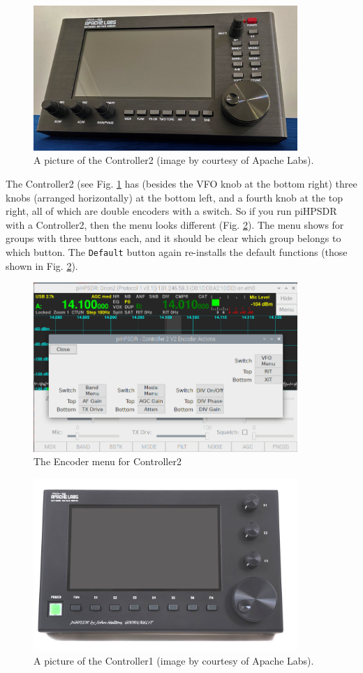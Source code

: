 \documentclass[12pt]{book}
\def\rett#1{\texttt{\color{red}#1}}
\def\pH{pi\-HPSDR }
\begin{document}
\begin{figure}[ht!]
\center
\includegraphics[width=10cm]{Apache_Controller2.png}
\caption{A picture of the Controller2 (image by courtesy of Apache Labs).}
\label{fig:Apache_Controller2}
\end{figure}

The Controller2 (see Fig. \ref{fig:Apache_Controller2}
has (besides the VFO knob at the bottom right) three knobs (arranged horizontally) at the bottom left,
and a fourth knob at the top right, all of which are double encoders with a switch.
So if you run \pH with a Controller2, then the menu looks different (Fig. \ref{fig:EncoderMenuV2}).
 The menu shows
for groups with three buttons each, and it should be clear which group belongs to which button. The
\rett{Default} button again re-installs the default functions (those shown in Fig. \ref{fig:EncoderMenuV2}).

\begin{figure}[ht!]
\center
\includegraphics[width=10cm]{EncoderMenuV2.png}
\caption{The Encoder menu for Controller2}
\label{fig:EncoderMenuV2}
\end{figure}

\begin{figure}[ht!]
\center
\includegraphics[width=10cm]{Apache_Controller1.png}
\caption{A picture of the Controller1 (image by courtesy of Apache Labs).}
\label{fig:Apache_Controller1}
\end{figure}
\end{document}
